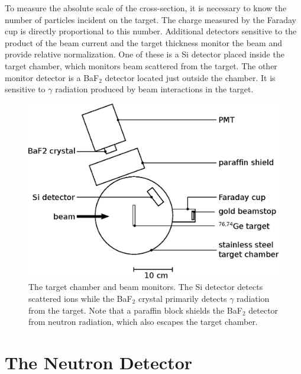 To measure the absolute scale of the cross-section, it is necessary to know the number of particles incident on the target.  The charge measured by the Faraday cup is directly proportional to this number.  Additional detectors sensitive to the product of the beam current and the target thickness monitor the beam and provide relative normalization.  One of these is a Si detector placed inside the target chamber, which monitors  beam scattered from the target.  The other monitor detector is a BaF$_2$ detector located just outside the chamber.  It is sensitive to $\gamma$ radiation produced by beam interactions in the target.  
\begin{figure}[htp]
\centering
\includegraphics[width=1.0\textwidth]{figures/targetChamber.eps}
\caption[The target chamber and beam monitors.]{The target chamber and beam monitors.  The Si detector detects scattered  ions while the BaF$_2$ crystal primarily detects $\gamma$ radiation from the target.  Note that a paraffin block shields the BaF$_2$ detector from neutron radiation, which also escapes the target chamber.}
\label{fig:targetChamber}
\end{figure}


\section{The Neutron Detector}
\label{sec:detector}

